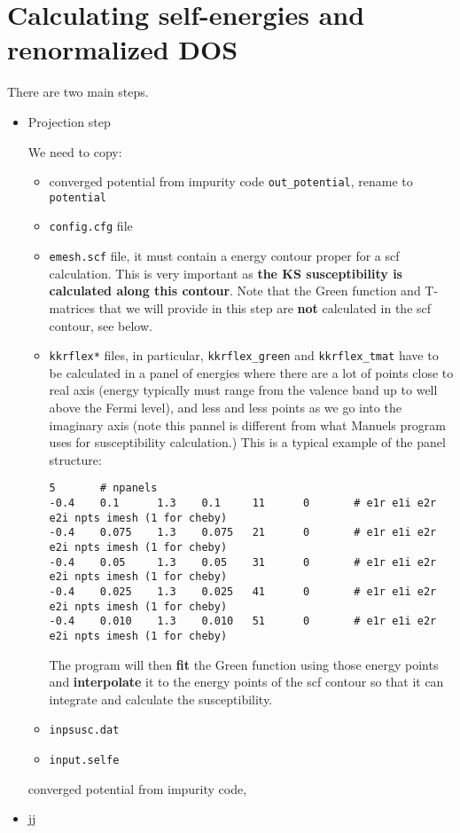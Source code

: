 \documentclass[a4paper,10pt,fullpage]{report}
\begin{document}
\section{Calculating self-energies and renormalized DOS}

There are two main steps.
\begin{itemize}
\item Projection step

We need to copy: 
\begin{itemize}
\item converged potential from impurity code \verb|out_potential|, rename to \verb|potential|
\item \verb|config.cfg| file

\item \verb|emesh.scf| file, it must contain a energy contour proper for a scf calculation.
This is very important as 
\textbf{the KS susceptibility is calculated along this contour}. Note that the
Green function and T-matrices that we will provide in this step are \textbf{not}
calculated in the scf contour, see below.

\item \verb|kkrflex*| files, in particular, \verb|kkrflex_green| and \verb|kkrflex_tmat| 
have to be calculated in a panel of energies where there are a lot of points close to real axis
(energy typically must range from the valence band up to well above the Fermi level),
and less and less points as we go into the imaginary axis (note this pannel is different from
what Manuels program uses for susceptibility calculation.) This
is a typical example of the panel structure:
\begin{verbatim}
5       # npanels
-0.4    0.1      1.3    0.1     11      0       # e1r e1i e2r e2i npts imesh (1 for cheby)
-0.4    0.075    1.3    0.075   21      0       # e1r e1i e2r e2i npts imesh (1 for cheby)
-0.4    0.05     1.3    0.05    31      0       # e1r e1i e2r e2i npts imesh (1 for cheby)
-0.4    0.025    1.3    0.025   41      0       # e1r e1i e2r e2i npts imesh (1 for cheby)
-0.4    0.010    1.3    0.010   51      0       # e1r e1i e2r e2i npts imesh (1 for cheby)
\end{verbatim}
The program will then \textbf{fit} the Green function using those energy points 
and \textbf{interpolate} it to the energy points of the scf contour so that it can
integrate and calculate the susceptibility.

\item \verb|inpsusc.dat|

\item \verb|input.selfe|

\end{itemize}
converged potential from impurity code,  

\item jj
\end{itemize}
\end{document}
